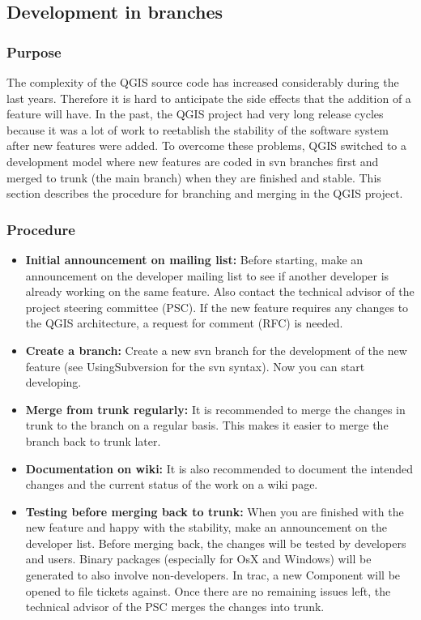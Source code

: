 \subsection{Development in branches}
\subsubsection{Purpose}
The complexity of the QGIS source code has increased considerably during the
last years. Therefore it is hard to anticipate the side effects that the
addition of a feature will have. In the past, the QGIS project had very long
release cycles because it was a lot of work to reetablish the stability of the
software system after new features were added. To overcome these problems, QGIS
switched to a development model where new features are coded in svn branches
first and merged to trunk (the main branch) when they are finished and stable.
This section describes the procedure for branching and merging in the QGIS
project.

\subsubsection{Procedure}
\begin{itemize}
\item \textbf{Initial announcement on mailing list:}
Before starting, make an announcement on the developer mailing list to see if
another developer is already working on the same feature. Also contact the
technical advisor of the project steering committee (PSC). If the new feature
requires any changes to the QGIS architecture, a request for comment (RFC) is
needed. 
\item \textbf{Create a branch:} 
Create a new svn branch for the development of the new feature (see
UsingSubversion for the svn syntax). Now you can start developing.
\item \textbf{Merge from trunk regularly:}
It is recommended to merge the changes in trunk to the branch on a regular
basis. This makes it easier to merge the branch back to trunk later.
\item \textbf{Documentation on wiki:} 
It is also recommended to document the intended changes and the current status
of the work on a wiki page.
\item \textbf{Testing before merging back to trunk:} 
When you are finished with the new feature and happy with the stability, make
an announcement on the developer list.  Before merging back, the changes will
be tested by developers and users. Binary packages (especially for OsX and
Windows) will be generated to also involve non-developers. In trac, a new
Component will be opened to file tickets against.  Once there are no remaining
issues left, the technical advisor of the PSC merges the changes into trunk.
\end{itemize}


